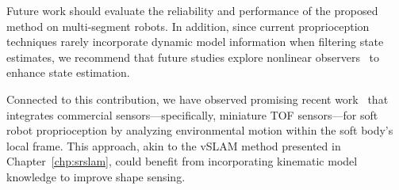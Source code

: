 Future work should evaluate the reliability and performance of the proposed method on multi-segment robots. In addition, since current proprioception techniques rarely incorporate dynamic model information when filtering state estimates, we recommend that future studies explore nonlinear observers~\citep{shao2023model} to enhance state estimation.

Connected to this contribution, we have observed promising recent work~\citep{caroleo2025soft} that integrates commercial sensors—specifically, miniature \gls{TOF} sensors—for soft robot proprioception by analyzing environmental motion within the soft body’s local frame. This approach, akin to the \gls{vSLAM} method presented in Chapter~\ref{chp:srslam}, could benefit from incorporating kinematic model knowledge to improve shape sensing.

